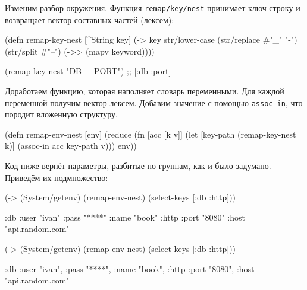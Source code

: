 Изменим разбор окружения. Функция \texttt{remap\-/key\-/nest} принимает ключ-строку и
возвращает вектор составных частей (лексем):

\begin{english}
  \begin{clojure}
(defn remap-key-nest
  [^String key]
  (-> key
      str/lower-case
      (str/replace #"_" "-")
      (str/split #"--")
      (->> (mapv keyword))))

(remap-key-nest "DB__PORT")
;; [:db :port]
  \end{clojure}
\end{english}


Доработаем функцию, которая наполняет словарь переменными. Для каждой переменной
получим вектор лексем. Добавим значение с помощью \verb|assoc-in|, что породит
вложенную структуру.

\begin{english}
  \begin{clojure}
(defn remap-env-nest
  [env]
  (reduce
   (fn [acc [k v]]
     (let [key-path (remap-key-nest k)]
       (assoc-in acc key-path v)))
   {}
   env))
  \end{clojure}
\end{english}

Код ниже вернёт параметры, разбитые по группам, как и было задумано. Приведём их
подмножество:

\ifnarrow

\begin{english}
  \begin{clojure}
(-> (System/getenv)
    (remap-env-nest)
    (select-keys [:db :http]))

{:db {:user "ivan"
      :pass "****"
      :name "book"}
 :http {:port "8080"
        :host "api.random.com"}}
  \end{clojure}
\end{english}

\else

\begin{english}
  \begin{clojure}
(-> (System/getenv)
    (remap-env-nest)
    (select-keys [:db :http]))

{:db {:user "ivan", :pass "****", :name "book"},
 :http {:port "8080", :host "api.random.com"}}
  \end{clojure}
\end{english}

